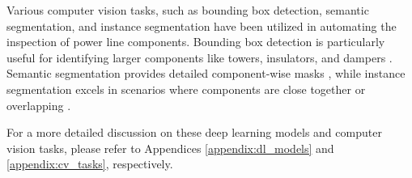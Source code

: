 Various computer vision tasks, such as bounding box detection, semantic segmentation, and instance segmentation have been utilized in automating the inspection of power line components. Bounding box detection is particularly useful for identifying larger components like towers, insulators, and dampers \cite{ge_birds_2022}. Semantic segmentation provides detailed component-wise masks \cite{electronics12153210, bob_semantic}, while instance segmentation excels in scenarios where components are close together or overlapping \cite{electronics12153210, bob_semantic}.

For a more detailed discussion on these deep learning models and computer vision tasks, please refer to Appendices \ref{appendix:dl_models} and \ref{appendix:cv_tasks}, respectively.
